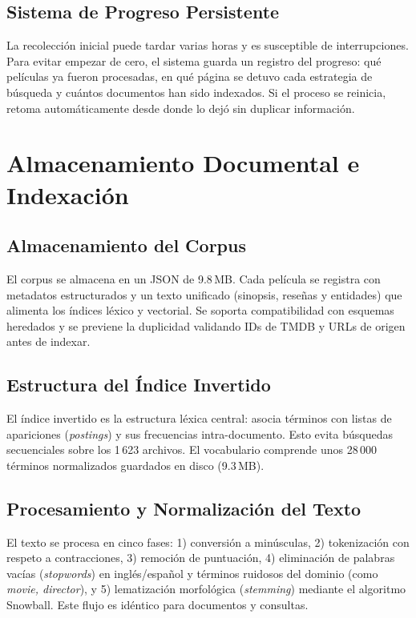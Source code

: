 \documentclass[10pt,a4paper]{llncs}
\begin{document}
\subsection{Sistema de Progreso Persistente}

La recolección inicial puede tardar varias horas y es susceptible de interrupciones. Para evitar empezar de cero, el sistema guarda un registro del progreso: qué películas ya fueron procesadas, en qué página se detuvo cada estrategia de búsqueda y cuántos documentos han sido indexados. Si el proceso se reinicia, retoma automáticamente desde donde lo dejó sin duplicar información.

\section{Almacenamiento Documental e Indexación}

\subsection{Almacenamiento del Corpus}

El corpus se almacena en un JSON de 9.8\,MB. Cada película se registra con metadatos estructurados y un texto unificado (sinopsis, reseñas y entidades) que alimenta los índices léxico y vectorial. Se soporta compatibilidad con esquemas heredados y se previene la duplicidad validando IDs de TMDB y URLs de origen antes de indexar.

\subsection{Estructura del Índice Invertido}

El índice invertido es la estructura léxica central: asocia términos con listas de apariciones (\textit{postings}) y sus frecuencias intra-documento. Esto evita búsquedas secuenciales sobre los 1\,623 archivos. El vocabulario comprende unos 28\,000 términos normalizados guardados en disco (9.3\,MB).

\subsection{Procesamiento y Normalización del Texto}

El texto se procesa en cinco fases: 1) conversión a minúsculas, 2) tokenización con respeto a contracciones, 3) remoción de puntuación, 4) eliminación de palabras vacías (\textit{stopwords}) en inglés/español y términos ruidosos del dominio (como \textit{movie, director}), y 5) lematización morfológica (\textit{stemming}) mediante el algoritmo Snowball. Este flujo es idéntico para documentos y consultas.
\end{document}
